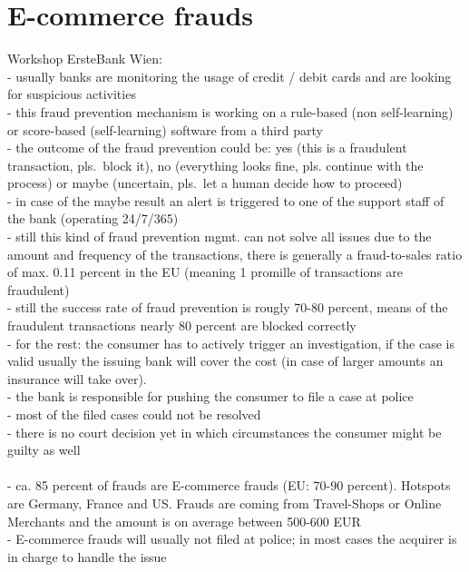 
\section{E-commerce frauds}
\label{sec:scenario_frauds}

Workshop ErsteBank Wien: \\
- usually banks are monitoring the usage of credit / debit cards and are looking for suspicious activities \\
- this fraud prevention mechanism is working on a rule-based (non self-learning) or score-based (self-learning) software from a third party \\
- the outcome of the fraud prevention could be: yes (this is a fraudulent transaction, pls.\ block it), no (everything looks fine, pls. continue with the process) or maybe (uncertain, pls.\ let a human decide how to proceed) \\
- in case of the maybe result an alert is triggered to one of the support staff of the bank (operating 24/7/365) \\
- still this kind of fraud prevention mgmt. can not solve all issues due to the amount and frequency of the transactions, there is generally a
fraud-to-sales ratio of max. 0.11 percent in the EU (meaning 1 promille of transactions are fraudulent) \\
- still the success rate of fraud prevention is rougly 70-80 percent, means of the fraudulent transactions nearly 80 percent are blocked correctly \\
- for the rest: the consumer has to actively trigger an investigation, if the case is valid usually the issuing bank will cover the cost (in case of larger amounts an insurance will take over). \\
- the bank is responsible for pushing the consumer to file a case at police \\
- most of the filed cases could not be resolved \\
- there is no court decision yet in which circumstances the consumer might be guilty as well \\
\\
- ca. 85 percent of frauds are E-commerce frauds (EU: 70-90 percent). Hotspots are Germany, France and US. Frauds are coming from Travel-Shops or Online Merchants and the amount is on average between 500-600 EUR \\
- E-commerce frauds will usually not filed at police; in most cases the acquirer is in charge to handle the issue \\
